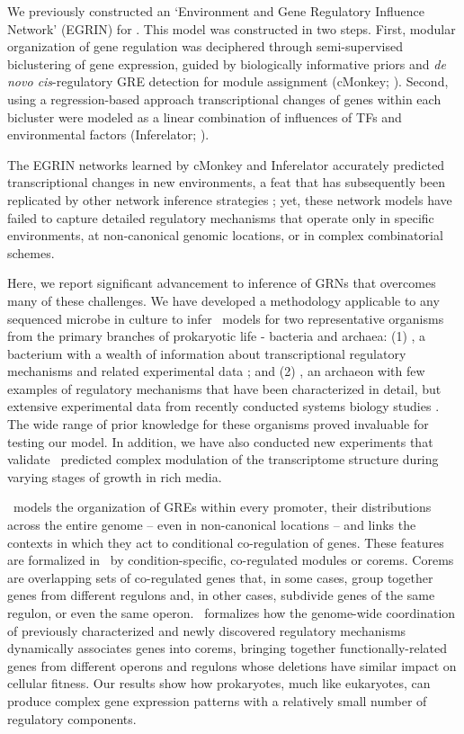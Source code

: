 We previously constructed an ‘Environment and Gene Regulatory Influence Network’ (EGRIN) for \halo \cite{bonneau_predictive_2007}. This model was constructed in two steps. First, modular organization of gene regulation was deciphered through semi-supervised biclustering of gene expression, guided by biologically informative priors and \textit{de novo cis}-regulatory GRE detection for module assignment (cMonkey; \cite{reiss_integrated_2006}). Second, using a regression-based approach transcriptional changes of genes within each bicluster were modeled as a linear combination of influences of TFs and environmental factors (Inferelator; \cite{bonneau_inferelator:_2006}). 

The EGRIN networks learned by cMonkey and Inferelator accurately predicted transcriptional changes in new environments, a feat that has subsequently been replicated by other network inference strategies \cite{faith_large-scale_2007,lemmens_distiller:_2009,marbach_wisdom_2012}; yet, these network models have failed to capture detailed regulatory mechanisms that operate only in specific environments, at non-canonical genomic locations, or in complex combinatorial schemes. 

Here, we report significant advancement to inference of GRNs that overcomes many of these challenges. We have developed a methodology applicable to any sequenced microbe in culture to infer \egrine~models for two representative organisms from the primary branches of prokaryotic life - bacteria and archaea: (1) \eco, a bacterium with a wealth of information about transcriptional regulatory mechanisms and related experimental data \cite{salgado_regulondb_2006}; and (2) \halo, an archaeon with few examples of regulatory mechanisms that have been characterized in detail, but extensive experimental data from recently conducted systems biology studies \cite{bonneau_predictive_2007,koide_prevalence_2009}. The wide range of prior knowledge for these organisms proved invaluable for testing our model. In addition, we have also conducted new experiments that validate \egrine~predicted complex modulation of the \eco transcriptome structure during varying stages of growth in rich media. 

\egrine~models the organization of GREs within every promoter, their distributions across the entire genome – even in non-canonical locations – and links the contexts in which they act to conditional co-regulation of genes. These features are formalized in \egrine~by condition-specific, co-regulated modules or corems.  Corems are overlapping sets of co-regulated genes that, in some cases, group together genes from different regulons and, in other cases, subdivide genes of the same regulon, or even the same operon. \egrine~formalizes how the genome-wide coordination of previously characterized and newly discovered regulatory mechanisms dynamically associates genes into corems, bringing together functionally-related genes from different operons and regulons whose deletions have similar impact on cellular fitness. Our results show how prokaryotes, much like eukaryotes, can produce complex gene expression patterns with a relatively small number of regulatory components.  

